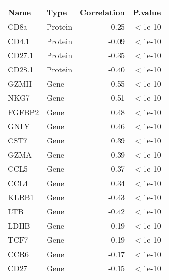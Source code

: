 \begin{tabular}{llrl}
  \hline
Name & Type & Correlation & P.value \\ 
  \hline
CD8a & Protein & 0.25 & $<$1e-10 \\ 
  CD4.1 & Protein & -0.09 & $<$1e-10 \\ 
  CD27.1 & Protein & -0.35 & $<$1e-10 \\ 
  CD28.1 & Protein & -0.40 & $<$1e-10 \\ 
  GZMH & Gene & 0.55 & $<$1e-10 \\ 
  NKG7 & Gene & 0.51 & $<$1e-10 \\ 
  FGFBP2 & Gene & 0.48 & $<$1e-10 \\ 
  GNLY & Gene & 0.46 & $<$1e-10 \\ 
  CST7 & Gene & 0.39 & $<$1e-10 \\ 
  GZMA & Gene & 0.39 & $<$1e-10 \\ 
  CCL5 & Gene & 0.37 & $<$1e-10 \\ 
  CCL4 & Gene & 0.34 & $<$1e-10 \\ 
  KLRB1 & Gene & -0.43 & $<$1e-10 \\ 
  LTB & Gene & -0.42 & $<$1e-10 \\ 
  LDHB & Gene & -0.19 & $<$1e-10 \\ 
  TCF7 & Gene & -0.19 & $<$1e-10 \\ 
  CCR6 & Gene & -0.17 & $<$1e-10 \\ 
  CD27 & Gene & -0.15 & $<$1e-10 \\ 
   \hline
\end{tabular}
